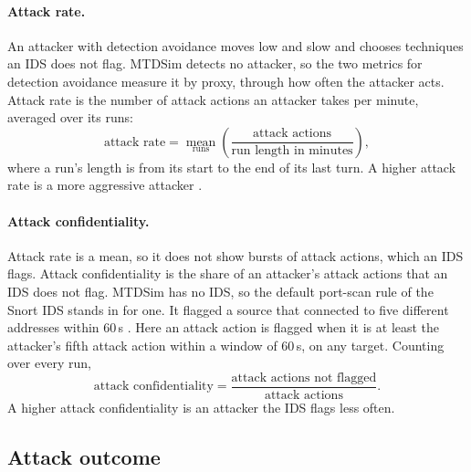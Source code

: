 \documentclass{cshonours}
\begin{document}
\paragraph{Attack rate.}
An attacker with detection avoidance moves low and slow and chooses techniques an IDS does not flag. MTDSim detects no attacker, so the two metrics for detection avoidance measure it by proxy, through how often the attacker acts.
Attack rate \citep{zhan2013} is the number of attack actions an attacker takes per
minute, averaged over its runs:
\begin{equation}
  \text{attack rate} = \operatorname*{mean}_{\text{runs}}
  \left( \frac{\text{attack actions}}{\text{run length in minutes}} \right),
  \label{eq:attack-rate}
\end{equation}
where a run's length is from its start to the end of its last turn. A higher
attack rate is a more aggressive attacker \citep{pendleton2016}.

\paragraph{Attack confidentiality.}
Attack rate is a mean, so it does not show bursts of attack actions, which
an IDS flags. Attack confidentiality \citep{zaffarano2015} is the share of an
attacker's attack actions that an IDS does not flag.
MTDSim has no IDS, so the default
port-scan rule of the Snort IDS stands in for one. It flagged a source that
connected to five different addresses within 60\,s
\citep[Sect.~5.2]{jung2004}. Here an attack action is flagged when it is at
least the attacker's fifth attack action within a window of 60\,s, on any
target. Counting
over every run,
\begin{equation}
  \text{attack confidentiality} =
  \frac{\text{attack actions not flagged}}{\text{attack actions}}.
  \label{eq:confidentiality}
\end{equation}
A higher attack confidentiality is an attacker the IDS flags less often.

\subsection{Attack outcome}
\label{subsec:metrics-outcome}
\end{document}

